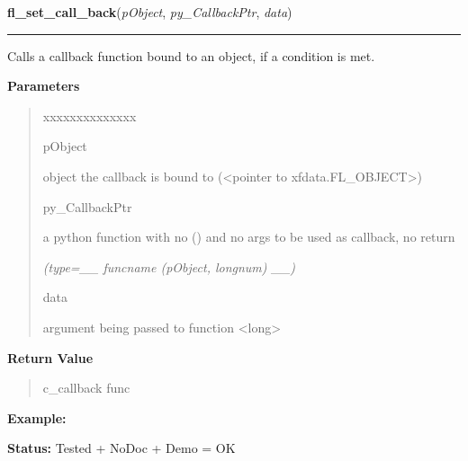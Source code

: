     \label{xformslib:library:fl_set_object_callback}

    \vspace{0.5ex}

\hspace{.8\funcindent}\begin{boxedminipage}{\funcwidth}

    \raggedright \textbf{fl\_set\_call\_back}(\textit{pObject}, \textit{py\_CallbackPtr}, \textit{data})

    \vspace{-1.5ex}

    \rule{\textwidth}{0.5\fboxrule}
\setlength{\parskip}{2ex}
    Calls a callback function bound to an object, if a condition is met.

\setlength{\parskip}{1ex}
      \textbf{Parameters}
      \vspace{-1ex}

      \begin{quote}
        \begin{Ventry}{xxxxxxxxxxxxxx}

          \item[pObject]

          object the callback is bound to ({\textless}pointer to 
          xfdata.FL\_OBJECT{\textgreater})

          \item[py\_CallbackPtr]

          a python function with no () and no args to be used as callback, 
          no return

            {\it (type=\_\_ funcname (pObject, longnum) \_\_)}

          \item[data]

          argument being passed to function {\textless}long{\textgreater}

        \end{Ventry}

      \end{quote}

      \textbf{Return Value}
    \vspace{-1ex}

      \begin{quote}
      c\_callback func

      \end{quote}

\textbf{Example:} 

\textbf{Status:} Tested + NoDoc + Demo = OK



    \end{boxedminipage}

